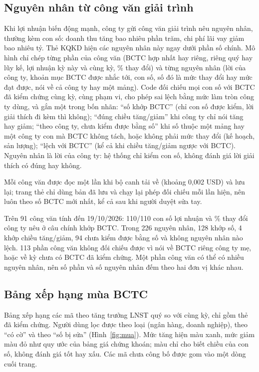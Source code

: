 \documentclass[12pt,a4paper]{report}
\newcommand{\enquote}[1]{“#1”}
\begin{document}
\subsection{Nguyên nhân từ công văn giải trình}\label{sec:congvan}
Khi lợi nhuận biến động mạnh, công ty gửi công văn giải trình nêu nguyên nhân, thường kèm con số: doanh thu tăng bao
nhiêu phần trăm, chi phí lãi vay giảm bao nhiêu tỷ. Thẻ KQKD hiện các nguyên nhân này ngay dưới phần số chính. Mô hình
chỉ chép từng phần của công văn (BCTC hợp nhất hay riêng, riêng quý hay lũy kế, lợi nhuận kỳ này và cùng kỳ, \% thay
đổi) và từng nguyên nhân (lời của công ty, khoản mục BCTC được nhắc tới, con số, số đó là mức thay đổi hay mức đạt
được, nói về cả công ty hay một mảng). Code đối chiếu mọi con số với BCTC đã kiểm chứng cùng kỳ, cùng phạm vi, cho
phép sai lệch bằng mức làm tròn công ty dùng, và gắn một trong bốn nhãn: \enquote{số khớp BCTC} (chỉ con số được kiểm,
lời giải thích đi kèm thì không); \enquote{đúng chiều
tăng/giảm} khi công ty chỉ nói tăng hay giảm; \enquote{theo công ty, chưa kiểm được bằng số} khi số thuộc một mảng
hay một công ty con mà BCTC không tách, hoặc không phải mức thay đổi (kế hoạch, sản lượng); \enquote{lệch với BCTC}
(kể cả khi chiều tăng/giảm ngược với BCTC).
Nguyên nhân là lời của công ty: hệ thống chỉ kiểm con số, không đánh giá lời giải thích có đúng hay không.

Mỗi công văn được đọc một lần khi bộ canh tải về (khoảng 0,002 USD) và lưu lại; trang thẻ chỉ dùng bản đã lưu và chạy
lại phép đối chiếu mỗi lần hiện, nên luôn theo số BCTC mới nhất, kể cả sau khi người duyệt sửa tay.

Trên 91 công văn tính đến 19/10/2026: 110/110 con số lợi nhuận và \% thay đổi công ty nêu ở câu chính khớp BCTC. Trong
226 nguyên nhân, 128 khớp số, 4 khớp chiều tăng/giảm, 94 chưa kiểm được bằng số và không nguyên nhân nào lệch. 113
phần công văn không đối chiếu được vì nói về BCTC riêng công ty mẹ, hoặc về kỳ chưa có BCTC đã kiểm chứng. Một phần công văn có thể có nhiều nguyên nhân, nên số phần và số nguyên nhân đếm theo hai đơn vị khác nhau.

\subsection{Bảng xếp hạng mùa BCTC}
Bảng xếp hạng các mã theo tăng trưởng LNST quý so với cùng kỳ, chỉ gồm thẻ đã kiểm chứng. Người dùng lọc được theo
loại (ngân hàng, doanh nghiệp), theo \enquote{có cờ} và theo \enquote{số bị sửa} (Hình~\ref{fig:mua}). Mức tăng hiện màu
xanh, mức giảm màu đỏ như quy ước của bảng giá chứng khoán; màu chỉ cho biết chiều của con số, không đánh giá tốt hay
xấu. Các mã chưa công bố được gom vào một dòng cuối trang.
\end{document}
